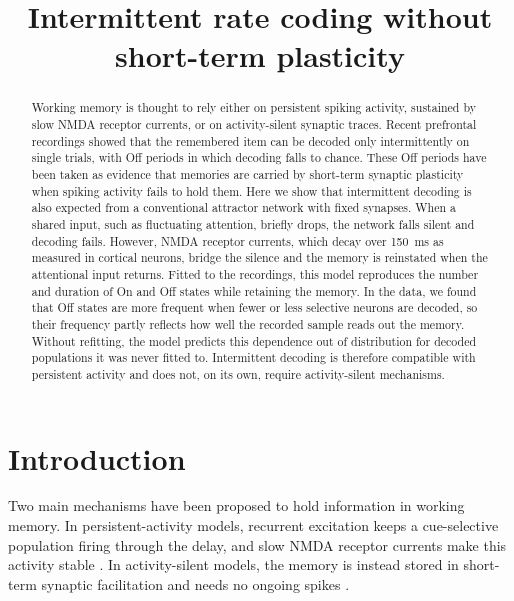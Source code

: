 \documentclass[11pt]{article}
\title{Intermittent rate coding without short-term plasticity}
\author{}
\date{}
\begin{document}
\maketitle

\begin{abstract}
Working memory is thought to rely either on persistent spiking activity, sustained by slow NMDA receptor currents, or on activity-silent synaptic traces.
Recent prefrontal recordings showed that the remembered item can be decoded only intermittently on single trials, with Off periods in which decoding falls to chance.
These Off periods have been taken as evidence that memories are carried by short-term synaptic plasticity when spiking activity fails to hold them.
Here we show that intermittent decoding is also expected from a conventional attractor network with fixed synapses.
When a shared input, such as fluctuating attention, briefly drops, the network falls silent and decoding fails.
However, NMDA receptor currents, which decay over 150~ms as measured in cortical neurons, bridge the silence and the memory is reinstated when the attentional input returns.
Fitted to the recordings, this model reproduces the number and duration of On and Off states while retaining the memory.
In the data, we found that Off states are more frequent when fewer or less selective neurons are decoded, so their frequency partly reflects how well the recorded sample reads out the memory.
Without refitting, the model predicts this dependence out of distribution for decoded populations it was never fitted to.
Intermittent decoding is therefore compatible with persistent activity and does not, on its own, require activity-silent mechanisms.
\end{abstract}

\section{Introduction}

Two main mechanisms have been proposed to hold information in working memory.
In persistent-activity models, recurrent excitation keeps a cue-selective population firing through the delay, and slow NMDA receptor currents make this activity stable \citep{amit1997,wang1999,wang2001,compte2000}.
In activity-silent models, the memory is instead stored in short-term synaptic facilitation and needs no ongoing spikes \citep{mongillo2008,stokes2015}.
\end{document}

